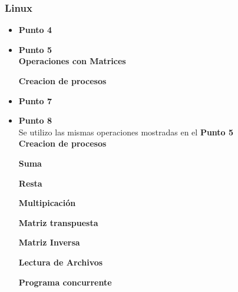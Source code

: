 \documentclass[12pt]{article}
\begin{document}
          \subsubsection{Linux}
          \begin{itemize}
                \item \textbf{Punto 4}
                
                
                
                \item \textbf{Punto 5}\\
                 \textbf{Operaciones con Matrices}
                 
                 \textbf{Creacion de procesos}
                  
                \item \textbf{Punto 7}
                
                \item \textbf{Punto 8}\\
                Se utilizo las mismas operaciones mostradas en el \textbf{Punto 5}\\
                \textbf{Creacion de procesos}
                
                \textbf{Suma}
                 
                \textbf{Resta}
                 
                \textbf{Multipicación}
                  
                \textbf{Matriz transpuesta}
                  
                \textbf{Matriz Inversa}
                  
                \textbf{Lectura de Archivos}
                  
                \textbf{Programa concurrente}
                
          \end{itemize}
    \newpage
\end{document}
